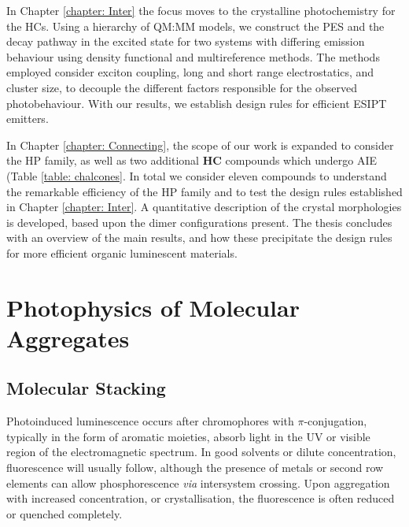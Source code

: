 In Chapter \ref{chapter: Inter} the focus moves to the crystalline photochemistry for the \acp{HC}. Using a hierarchy of QM:MM models, we construct the \ac{PES} and the decay pathway in the excited state for two systems with differing emission behaviour using density functional and multireference methods. The methods employed consider exciton coupling, long and short range electrostatics, and cluster size, to decouple the different factors responsible for the observed photobehaviour. With our results, we establish design rules for efficient ESIPT emitters.

In Chapter \ref{chapter: Connecting}, the scope of our work is expanded to consider the \ac{HP} family, as well as two additional \textbf{HC} compounds which undergo AIE (Table \ref{table: chalcones}. In total we consider eleven compounds to understand the remarkable efficiency of the \ac{HP} family and to test the design rules established in Chapter \ref{chapter: Inter}. A quantitative description of the crystal morphologies is developed, based upon the dimer configurations present. The thesis concludes with an overview of the main results, and how these precipitate the design rules for more efficient organic luminescent materials. 
\section{Photophysics of Molecular Aggregates}\label{section: lom ACQ}
\subsection{Molecular Stacking}
Photoinduced luminescence occurs after chromophores with $\pi$-conjugation, typically in the form of aromatic moieties, absorb light in the \ac{UV} or visible region of the electromagnetic spectrum. In good solvents or dilute concentration, fluorescence will usually follow, although the presence of metals or second row elements can allow phosphorescence \textit{via} intersystem crossing. Upon aggregation with increased concentration, or crystallisation, the fluorescence is often reduced or quenched completely. 


